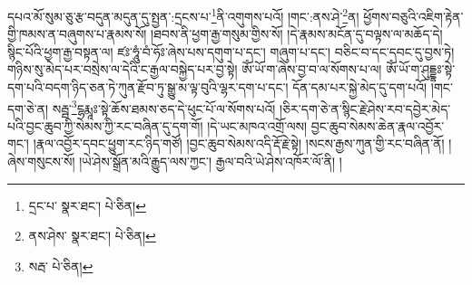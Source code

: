 དཔའ་མོ་སུམ་ཅུ་རྩ་བདུན་མདུན་དུ་སྤྱན་:དྲངས་པ་\footnote{དྲང་པ་  སྣར་ཐང་།  པེ་ཅིན། }ནི་འགུགས་པའོ། །གང་:ནས་ཤེ་\footnote{ནས་ཤེས་  སྣར་ཐང་།  པེ་ཅིན། }ན། ཕྱོགས་བཅུའི་འཇིག་རྟེན་གྱི་ཁམས་ན་བཞུགས་པ་རྣམས་སོ། །ཐབས་ནི་ཕྱག་རྒྱ་གསུམ་གྱིས་སོ། །དེ་རྣམས་མངོན་དུ་བལྟས་ལ་མཆོད་དེ། སྙིང་པོའི་ཕྱག་རྒྱ་བསྟན་ལ། ཛཿ་ཧཱུཾ་བཾ་ཧོཿ་ཞེས་པས་དགུག་པ་དང་། གཞུག་པ་དང་། བཅིང་བ་དང་དབང་དུ་བྱས་ཏེ། གཉིས་སུ་མེད་པར་བསྲེས་ལ་དེའི་ང་རྒྱལ་བསྐྱེད་པར་བྱ་སྟེ། ཨོཾ་ཡོ་ག་ཞེས་བྱ་བ་ལ་སོགས་པ་ལ། ཨོཾ་ཡོ་ག་ཤུདྡྷཿ་སྟེ་དག་པའི་བདག་ཉིད་ཅན་ཏེ་ཀུན་རྫོབ་ཏུ་སྒྱུ་མ་ལྟ་བུའི་ལྷར་དག་པ་དང་། དོན་དམ་པར་སྐྱེ་མེད་དུ་དག་པའོ། །གང་དག་ཅེ་ན། སརྦྦ་\footnote{སརྦ་  པེ་ཅིན། }ངྷརྨཱཿ་སྟེ་ཆོས་ཐམས་ཅད་དེ་ཕུང་པོ་ལ་སོགས་པའོ། །ཅིར་དག་ཅེ་ན་སྙིང་རྗེ་ཤེས་རབ་དབྱེར་མེད་པའི་བྱང་ཆུབ་ཀྱི་སེམས་ཀྱི་རང་བཞིན་དུ་དག་གོ། །དེ་ཡང་མཁའ་འགྲོ་ལས། བྱང་ཆུབ་སེམས་ཆེན་རྣལ་འབྱོར་གང་། །རྣལ་འབྱོར་དབང་ཕྱུག་རང་ཉིད་གཙོ། །བྱང་ཆུབ་སེམས་འདི་རྡོ་རྗེ་སྟེ། །སངས་རྒྱས་ཀུན་གྱི་རང་བཞིན་ནོ། །ཞེས་གསུངས་སོ། །ཡེ་ཤེས་སྒྲོན་མའི་རྒྱུད་ལས་ཀྱང་། རྒྱལ་བའི་ཡེ་ཤེས་འཁོར་ལོ་ནི། །
